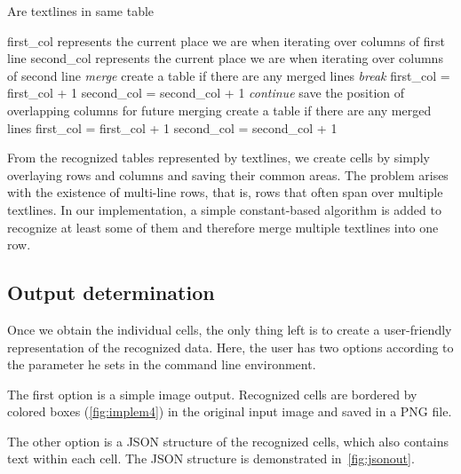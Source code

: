 \begin{algorithm}[t]
\caption{Are textlines in same table}
{\scriptsize
\label{alg:tableMerge}
\begin{algorithmic}
\Require first\_col \Comment represents the current place we are when iterating over columns of first line
\State second\_col \Comment represents the current place we are when iterating over columns of second line
\State \emph{merge}
\Else
\State create a table if there are any merged lines
\EndIf
\State \emph{break}
\EndIf
{}
\State first\_col = first\_col + 1 
\Else
\State second\_col = second\_col + 1 
\EndIf
\State \emph{continue}
\EndIf
{}
\State save the position of overlapping columns for future merging
\Else
\State create a table if there are any merged lines
\EndIf
\State first\_col = first\_col + 1 
\State  second\_col = second\_col + 1 
\EndWhile
\end{algorithmic}}
\end{algorithm}

From the recognized tables represented by textlines, we create cells by simply overlaying rows and columns and saving their common areas. The problem arises with the existence of multi-line rows, that is, rows that often span over multiple textlines. In our implementation, a simple constant-based algorithm is added to recognize at least some of them and therefore merge multiple textlines into one row.

\subsection{Output determination}

Once we obtain the individual cells, the only thing left is to create a user-friendly representation of the recognized data. Here, the user has two options according to the parameter he sets in the command line environment. 

The first option is a simple image output. Recognized cells are bordered by colored boxes (\cref{fig:implem4}) in the original input image and saved in a PNG file.

The other option is a JSON structure of the recognized cells, which also contains text within each cell. The JSON structure is demonstrated in~\cref{fig:jsonout}.

